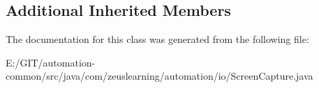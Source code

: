 \subsection*{Additional Inherited Members}


The documentation for this class was generated from the following file\+:\begin{DoxyCompactItemize}
\item 
E\+:/\+G\+I\+T/automation-\/common/src/java/com/zeuslearning/automation/io/Screen\+Capture.\+java\end{DoxyCompactItemize}
